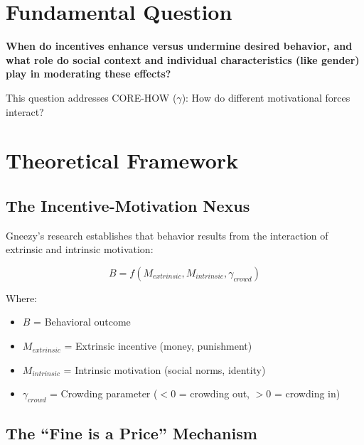 \section{Fundamental Question}

\begin{tcolorbox}[colback=yellow!10!white,colframe=orange!75!black,title=Central Research Question]
\textbf{When do incentives enhance versus undermine desired behavior, and what role do social context and individual characteristics (like gender) play in moderating these effects?}
\end{tcolorbox}

This question addresses CORE-HOW ($\gamma$): How do different motivational forces interact?

\section{Theoretical Framework}

\subsection{The Incentive-Motivation Nexus}

Gneezy's research establishes that behavior results from the interaction of extrinsic and intrinsic motivation:

\begin{equation}
B = f(M_{extrinsic}, M_{intrinsic}, \gamma_{crowd})
\end{equation}

Where:
\begin{itemize}
    \item $B$ = Behavioral outcome
    \item $M_{extrinsic}$ = Extrinsic incentive (money, punishment)
    \item $M_{intrinsic}$ = Intrinsic motivation (social norms, identity)
    \item $\gamma_{crowd}$ = Crowding parameter ($<0$ = crowding out, $>0$ = crowding in)
\end{itemize}

\subsection{The ``Fine is a Price'' Mechanism}

